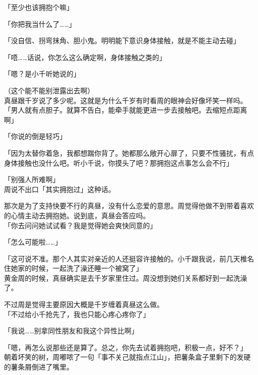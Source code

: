 「至少也该拥抱个嘛」

「你把我当什么了……」

「没自信、拐弯抹角、胆小鬼。明明能下意识身体接触，就是不能主动去碰」

「唔……话说，你怎么这么确定啊，身体接触之类的」

「嗯？是小千听她说的」

（这个能不能别泄露出去啊）\\

真昼跟千岁说了多少呢。这就是为什么千岁有时看周的眼神会好像坏笑一样吗。\\

「男人就有点胆子。就算不告白，能牵手就能更进一步去接触吧。去缩短点距离啊」

「你说的倒是轻巧」

「因为太替你着急，我都想踹你背了。她都那么敞开心扉了，只要不性骚扰，有点身体接触也没什么吧。听小千说，你摸头了吧？那拥抱这点事怎么会不行」

「别强人所难啊」\\

周说不出口「其实拥抱过」这种话。

那次是为了支持快要不行的真昼，没有什么恋爱的意思。周觉得他做不到带着喜欢的心情主动去拥抱她。说到底，真昼会答应吗。\\

「你去问问她试试看？我是觉得她会爽快同意的」

「怎么可能啦……」

「这可说不准。那个人其实对亲近的人还挺容许接触的。小千跟我说，前几天椎名住她家的时候，一起洗了澡还睡一个被窝了」\\

黄金周的时候，真昼确实是去千岁家里住过。周没想到她们关系都好到一起洗澡了。

不过周是觉得主要原因大概是千岁缠着真昼这么做。\\

「不过给小千抢先了，我也只能心疼心疼你了」

「我说……别拿同性朋友和我这个异性比啊」

「嗯，再怎么说那些还是算了。总之，你先去试着拥抱吧，积极一点，好不？」\\

朝着坏笑的树，周嘟哝了一句「事不关己就指点江山」，把薯条盒子里剩下的发硬的薯条屑倒进了嘴里。
